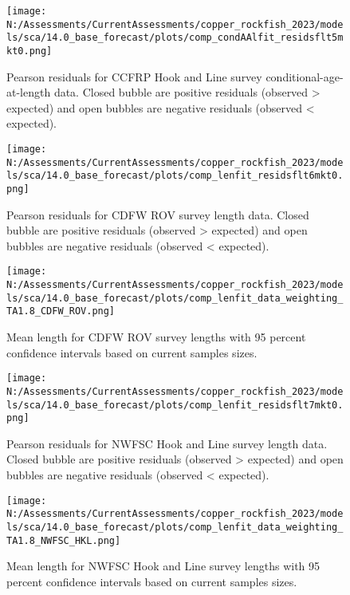 \documentclass[11pt,
  english,
  letterpaper,
]{article}
\begin{document}
\pagebreak

\begin{figure}
\centering
\texttt{[image: N:/Assessments/CurrentAssessments/copper\_rockfish\_2023/models/sca/14.0\_base\_forecast/plots/comp\_condAAlfit\_residsflt5mkt0.png]}
\caption{Pearson residuals for CCFRP Hook and Line survey conditional-age-at-length data. Closed bubble are positive residuals (observed \textgreater{} expected) and open bubbles are negative residuals (observed \textless{} expected).\label{fig:ccfrp-age-pearson}}
\end{figure}

\pagebreak

\begin{figure}
\centering
\texttt{[image: N:/Assessments/CurrentAssessments/copper\_rockfish\_2023/models/sca/14.0\_base\_forecast/plots/comp\_lenfit\_residsflt6mkt0.png]}
\caption{Pearson residuals for CDFW ROV survey length data. Closed bubble are positive residuals (observed \textgreater{} expected) and open bubbles are negative residuals (observed \textless{} expected).\label{fig:rov-pearson}}
\end{figure}

\pagebreak

\begin{figure}
\centering
\texttt{[image: N:/Assessments/CurrentAssessments/copper\_rockfish\_2023/models/sca/14.0\_base\_forecast/plots/comp\_lenfit\_data\_weighting\_TA1.8\_CDFW\_ROV.png]}
\caption{Mean length for CDFW ROV survey lengths with 95 percent confidence intervals based on current samples sizes.\label{fig:rov-mean-len-fit}}
\end{figure}

\pagebreak

\begin{figure}
\centering
\texttt{[image: N:/Assessments/CurrentAssessments/copper\_rockfish\_2023/models/sca/14.0\_base\_forecast/plots/comp\_lenfit\_residsflt7mkt0.png]}
\caption{Pearson residuals for NWFSC Hook and Line survey length data. Closed bubble are positive residuals (observed \textgreater{} expected) and open bubbles are negative residuals (observed \textless{} expected).\label{fig:nwfsc-hkl-pearson}}
\end{figure}

\pagebreak

\begin{figure}
\centering
\texttt{[image: N:/Assessments/CurrentAssessments/copper\_rockfish\_2023/models/sca/14.0\_base\_forecast/plots/comp\_lenfit\_data\_weighting\_TA1.8\_NWFSC\_HKL.png]}
\caption{Mean length for NWFSC Hook and Line survey lengths with 95 percent confidence intervals based on current samples sizes.\label{fig:nwfsc-hkl-mean-len-fit}}
\end{figure}
\end{document}
